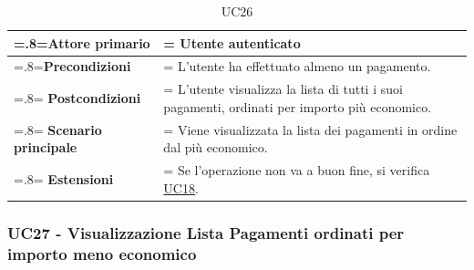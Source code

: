             \begin{table}[H]
                \centering
                \renewcommand{\arraystretch}{1.8}
                \renewcommand\tabularxcolumn[1]{m{#1}}
                \begin{tabularx}{0.9\textwidth} {
                    >{\hsize=.8\hsize\linewidth=\hsize}X
                    >{\hsize=1.2\hsize\linewidth=\hsize}X}
                    \hline
                    \textbf{Attore primario} & Utente autenticato \\
                    \hline
                    \textbf{Precondizioni} & L'utente ha effettuato almeno un pagamento. \\
                    \hline
                    \textbf{Postcondizioni} & L'utente visualizza la lista di tutti i suoi pagamenti, ordinati per importo più economico. \\
                    \hline
                    \textbf{Scenario principale} & Viene visualizzata la lista dei pagamenti in ordine dal più economico. \\
                    \hline
                    \textbf{Estensioni} & Se l'operazione non va a buon fine, si verifica \hyperref[UC18]{UC18}. \\
                    \hline
                \end{tabularx}
                \caption{UC26}
            \end{table}

        \subsubsection{UC27 - Visualizzazione Lista Pagamenti ordinati per importo meno economico}
        \label{UC27}

